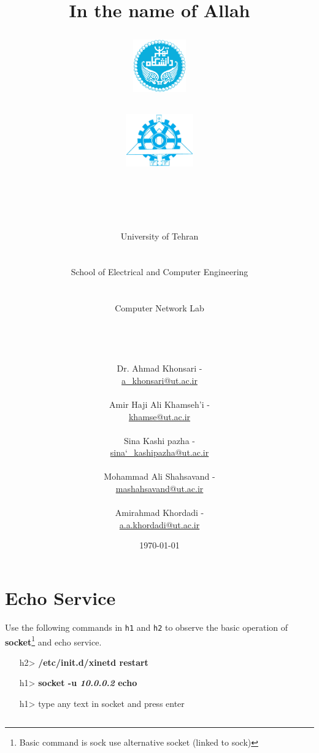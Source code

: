 \documentclass[10pt,a4paper]{article}
\title{
\normalsize In the name of Allah\\
\vspace{10pt}
\LARGE\FR{بسم \allah الرحمن الرحیم}
\vspace{10pt}
\begin{center}
	\begin{minipage}{0.48\textwidth} \begin{flushleft}
			\includegraphics[height=64pt,width=64pt]{../img/logo.png}
	\end{flushleft}\end{minipage}
	\begin{minipage}{0.48\textwidth} \begin{flushright}
			\includegraphics[height=64pt]{../img/eng-logo.png}
	\end{flushright}\end{minipage}
\end{center}
\vspace*{-64pt}
	\huge \titleText\\
\vspace{40pt}
}
\author{
	\huge University of Tehran\\
	\LARGE \FR{دانشگاه تهران}\\
	\\
	\LARGE School of Electrical and Computer Engineering\\
	\FR{دانشکده مهندسی برق و کامپیوتر}\\
	\\
	\Large Computer Network Lab\\
	\FR{آزمایشگاه شبکه‌های کامپیوتری}\\
	\\
	\\
	\\
	\normalfont
	Dr. Ahmad Khonsari - \FR{احمد خونساری}\\
	\href{mailto:a_khonsari@ut.ac.ir}{a\_khonsari@ut.ac.ir}\\
	\\
	\normalsize
	Amir Haji Ali Khamseh'i - \FR{امیر حاجی علی خمسه‌ء}\\
	\href{mailto:khamse@ut.ac.ir}{khamse@ut.ac.ir}\\
	\\
	\normalsize
	Sina Kashi pazha - \FR{سینا کاشی پزها}\\
	\href{mailto:sina\char`_kashipazha@ut.ac.ir}{sina\char`_kashipazha@ut.ac.ir}\\
	\\
	\normalsize
	Mohammad Ali Shahsavand - \FR{محمد علی شاهسوند}\\
	\href{mailto:mashahsavand@ut.ac.ir}{mashahsavand@ut.ac.ir}\\
	\\
	\normalsize
	Amirahmad Khordadi - \FR{امیر احمد خردادی}\\
	\href{mailto:a.a.khordadi@ut.ac.ir}{a.a.khordadi@ut.ac.ir}
}
\date{\vspace{30pt}\today\\\vspace{10pt}{\selectlanguage{farsi}\today}}
\numberwithin{equation}{section}
\numberwithin{figure}{section}
\numberwithin{table}{section}
\begin{document}

\maketitle


\pagebreak




\section{Echo Service}
Use the following commands in \texttt{h1} and \texttt{h2} to observe the basic operation of \textbf{socket}\footnote{Basic command is sock use alternative socket (linked to sock)} and echo service. \\
\begin{itemize}
	\item [h2>] \textbf{/etc/init.d/xinetd restart}
	\item [h1>] \textbf{socket -u \textit{10.0.0.2} echo}
	\item [h1>]type any text in socket and press enter
\end{itemize}
\begin{lstlisting}[language=bash]
\end{lstlisting}
\end{document}
